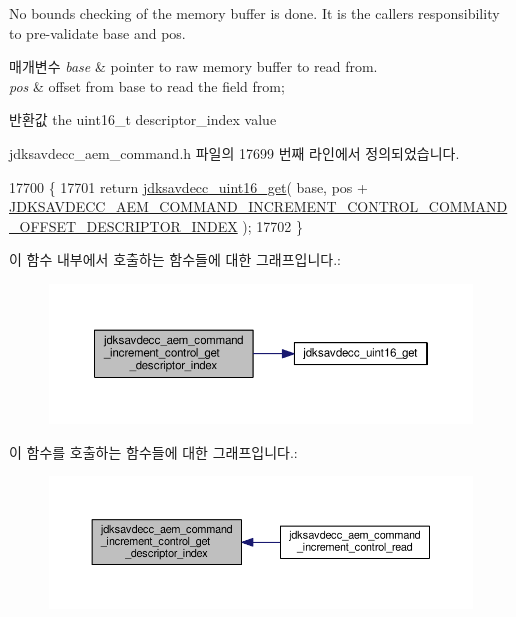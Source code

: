 No bounds checking of the memory buffer is done. It is the caller\textquotesingle{}s responsibility to pre-\/validate base and pos.


\begin{DoxyParams}{매개변수}
{\em base} & pointer to raw memory buffer to read from. \\
\hline
{\em pos} & offset from base to read the field from; \\
\hline
\end{DoxyParams}
\begin{DoxyReturn}{반환값}
the uint16\+\_\+t descriptor\+\_\+index value 
\end{DoxyReturn}


jdksavdecc\+\_\+aem\+\_\+command.\+h 파일의 17699 번째 라인에서 정의되었습니다.


\begin{DoxyCode}
17700 \{
17701     \textcolor{keywordflow}{return} \hyperlink{group__endian_ga3fbbbc20be954aa61e039872965b0dc9}{jdksavdecc\_uint16\_get}( base, pos + 
      \hyperlink{group__command__increment__control_ga32849febcbe1ba8a6d964804c6625882}{JDKSAVDECC\_AEM\_COMMAND\_INCREMENT\_CONTROL\_COMMAND\_OFFSET\_DESCRIPTOR\_INDEX}
       );
17702 \}
\end{DoxyCode}


이 함수 내부에서 호출하는 함수들에 대한 그래프입니다.\+:
\nopagebreak
\begin{figure}[H]
\begin{center}
\leavevmode
\includegraphics[width=350pt]{group__command__increment__control_ga0222729b13a7e4af97ac69aa8e8e38a6_cgraph}
\end{center}
\end{figure}




이 함수를 호출하는 함수들에 대한 그래프입니다.\+:
\nopagebreak
\begin{figure}[H]
\begin{center}
\leavevmode
\includegraphics[width=350pt]{group__command__increment__control_ga0222729b13a7e4af97ac69aa8e8e38a6_icgraph}
\end{center}
\end{figure}


